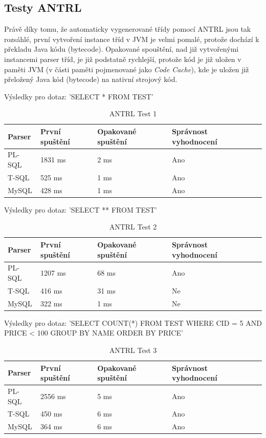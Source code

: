 \documentclass[czech,bachelor,public,dept460,male,cpdeclaration,twoside]{diploma}
\begin{document}
\subsection{Testy ANTRL}
Právě díky tomu, že automaticky vygenerované třídy pomocí ANTRL jsou tak rozsáhlé, první vytvoření instance tříd v JVM je velmi pomalé, protože dochází k překladu Java kódu (bytecode). Opakované spouštění, nad již vytvořenými instancemi parser tříd, je již podstatně rychlejší, protože kód je již uložen v paměti JVM (v části paměti pojmenované jako \textit{Code Cache}), kde je uložen již přeložený Java kód (bytecode) na nativní strojový kód.

\begin{table}[!htbp]
	\centering
	\caption{ANTRL Test 1}
	Výsledky pro dotaz: 'SELECT * FROM TEST'
	\vskip 0.1cm
	\label{tab:antrl1}
	\begin{tabular}{lllll}
		\toprule
		Parser & První spuštění & Opakované spuštění & Správnost vyhodnocení\\
		\midrule
		PL-SQL & 1831 ms & 2 ms & Ano \\
        T-SQL & 525 ms & 1 ms & Ano \\
        MySQL & 428 ms & 1 ms & Ano \\
		\midrule
	\end{tabular}
\end{table}

\begin{table}[!htbp]
	\centering
	\caption{ANTRL Test 2}
	Výsledky pro dotaz: 'SELECT ** FROM TEST'
	\vskip 0.1cm
	\label{tab:antrl2}
	\begin{tabular}{lllll}
		\toprule
		Parser & První spuštění & Opakované spuštění & Správnost vyhodnocení\\
		\midrule
		PL-SQL & 1207 ms & 68 ms & Ano \\
        T-SQL & 416 ms &31 ms & Ne \\
        MySQL & 322 ms & 1 ms & Ne \\
		\midrule
	\end{tabular}
\end{table}

\begin{table}[!htbp]
	\centering
	\caption{ANTRL Test 3}
	Výsledky pro dotaz: 'SELECT COUNT(*) FROM TEST WHERE CID = 5 AND PRICE < 100 GROUP BY NAME ORDER BY PRICE'
	\vskip 0.1cm
	\label{tab:antrl3}
	\begin{tabular}{lllll}
		\toprule
		Parser & První spuštění & Opakované spuštění & Správnost vyhodnocení\\
		\midrule
		PL-SQL & 2556 ms & 5 ms & Ano \\
        T-SQL & 450 ms & 6 ms & Ano \\
        MySQL & 364 ms & 6 ms & Ano \\
		\midrule
	\end{tabular}
\end{table}
\end{document}
